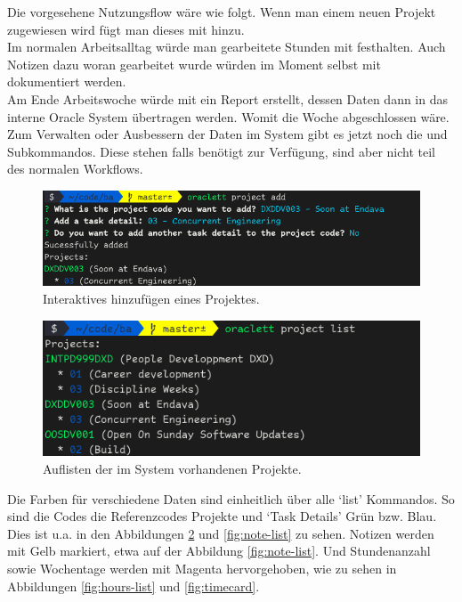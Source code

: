 \documentclass[oneside,bibliography=totocnumbered,BCOR=5mm]{scrbook}
\begin{document}
Die vorgesehene Nutzungsflow wäre wie folgt. Wenn man einem neuen Projekt
zugewiesen wird fügt man dieses  mit  hinzu.
\\
Im normalen Arbeitsalltag würde man gearbeitete Stunden mit  festhalten. Auch Notizen dazu woran gearbeitet wurde würden im Moment
selbst mit  dokumentiert werden.
\\
Am Ende Arbeitswoche würde mit  ein Report erstellt, dessen
Daten dann in das interne Oracle System übertragen werden. Womit die Woche
abgeschlossen wäre.
\\
Zum Verwalten oder Ausbessern der Daten im System gibt es jetzt noch die
 und  Subkommandos. Diese stehen falls
benötigt zur Verfügung, sind aber nicht teil des normalen Workflows.

\begin{figure}
  \centering
  \includegraphics[scale=0.5]{project-add.png}
  \caption{Interaktives hinzufügen eines Projektes.}
  \label{fig:project-add}
\end{figure}

\begin{figure}
  \centering
  \includegraphics[scale=0.5]{project-list.png}
  \caption{Auflisten der im System vorhandenen Projekte.}
  \label{fig:project-list}
\end{figure}

Die Farben für verschiedene Daten sind einheitlich über alle `list' Kommandos.
So sind die Codes die Referenzcodes Projekte und `Task Details' Grün
bzw. Blau. Dies ist u.a. in den Abbildungen \ref{fig:project-list} und
\ref{fig:note-list} zu sehen. Notizen werden mit Gelb markiert, etwa auf der
Abbildung \ref{fig:note-list}. Und Stundenanzahl sowie Wochentage werden mit
Magenta hervorgehoben, wie zu sehen in Abbildungen \ref{fig:hours-list} und
\ref{fig:timecard}.
\end{document}
